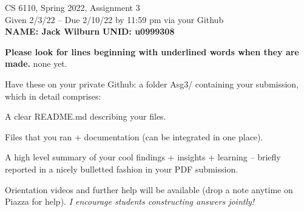 \documentclass[11pt]{article}
\begin{document}

\newlength{\minpagw}
\settowidth{\minpagw}{\hspace{40em}}

\begin{center}
\begin{large}
  CS 6110, Spring 2022, Assignment 3  \\
  Given 2/3/22 -- Due 2/10/22 by 11:59 pm via your Github 
  \ \\
    {  {\Large\bf NAME: Jack Wilburn} \hfill {\Large\bf UNID: u0999308}\hspace{4cm} }
          \ \\
\end{large}

\end{center}

 {\bf Please look for lines beginning with underlined words when they are made.}
         {\tiny none yet.}

         Have these on your private Github:
         a folder Asg3/ containing your submission, which in detail comprises:
         \begin{compactitem}
         \item A clear README.md describing your files.
         \item Files that you ran + documentation (can be integrated in one place).
         \item A high level summary of your cool findings + insights + learning -- briefly reported in
           a nicely bulletted fashion in your PDF submission.
         \end{compactitem}

Orientation videos and further help will be available (drop a note anytime
on Piazza for help). {\em I encourage students constructing answers jointly!}
\end{document}
